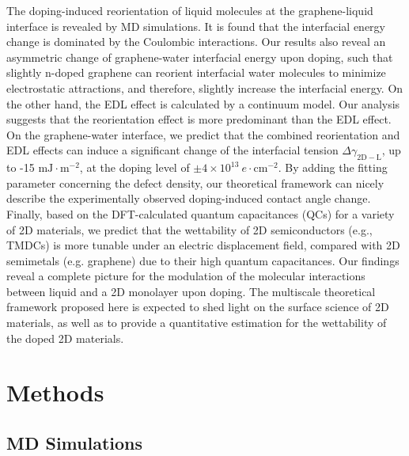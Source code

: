 The doping-induced reorientation of liquid molecules at the
graphene-liquid interface is revealed by MD simulations. It is
found that the interfacial energy change is dominated by the Coulombic
interactions. Our results also reveal an asymmetric change of
graphene-water interfacial energy upon doping, such that slightly
n-doped graphene can reorient interfacial water molecules to minimize
electrostatic attractions, and therefore, slightly increase the
interfacial energy. 
%
On the other hand, the EDL effect is calculated by a continuum model. Our
analysis suggests that the reorientation effect is more predominant
than the EDL effect. On the graphene-water interface, we predict that
the combined reorientation and EDL effects can induce a significant
change of the interfacial tension \(\Delta
\gamma_{\mathrm{2D-L}}\), up to -15 \(\mathrm{mJ}\cdot
\mathrm{m}^{-2}\), at the doping level of \(\pm 4 \times 10^{13}\ e\cdot
\mathrm{cm}^{-2}\). By adding the fitting parameter concerning the
defect density, our theoretical framework can nicely describe the
experimentally observed doping-induced contact angle change. Finally,
based on the DFT-calculated quantum capacitances (QCs) for a variety
of 2D materials, we predict that the wettability of 2D semiconductors
(e.g., TMDCs) is more tunable under an electric displacement field,
compared with 2D semimetals (e.g. graphene) due to their high quantum
capacitances. Our findings reveal a complete picture for the
modulation of the molecular interactions between liquid and a 2D monolayer upon
doping. The multiscale theoretical
framework proposed here is expected to shed
light on the surface science of 2D materials, 
as well as to provide a quantitative estimation for the wettability
of the doped 2D materials. 

\section{Methods}
\label{sec:wet-methods}

\subsection*{MD Simulations}
\label{sec:wet-md-simulations}


